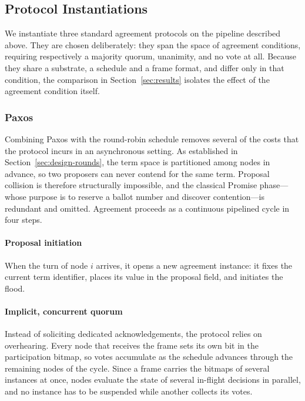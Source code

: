 \documentclass[journal]{IEEEtran}
\newcommand{\CI}{CI}                      %
\begin{document}
\subsection{Protocol Instantiations}
\label{sec:design-protocols}
We instantiate three standard agreement protocols on the pipeline
described above. They are chosen deliberately: they span the space of
agreement conditions, requiring respectively a majority quorum, unanimity,
and no vote at all. Because they share a substrate, a schedule and a frame
format, and differ only in that condition, the comparison in
Section~\ref{sec:results} isolates the effect of the agreement condition
itself.

\subsubsection{Paxos}
\label{sec:design-paxos}


Combining Paxos with the round-robin schedule removes several of the
costs that the protocol incurs in an asynchronous setting. As established
in Section~\ref{sec:design-rounds}, the term space is partitioned among
nodes in advance, so two proposers can never contend for the same term.
Proposal collision is therefore structurally impossible, and the classical
Promise phase---whose purpose is to reserve a ballot number and discover
contention---is redundant and omitted. Agreement proceeds as a continuous
pipelined cycle in four steps.

\paragraph{Proposal initiation}
When the turn of node $i$ arrives, it opens a new agreement instance: it
fixes the current term identifier, places its value in the proposal field,
and initiates the flood.

\paragraph{Implicit, concurrent quorum}
Instead of soliciting dedicated acknowledgements, the protocol relies on
overhearing. Every node that receives the frame sets its own bit in the
participation bitmap, so votes accumulate as the schedule advances through
the remaining nodes of the cycle. Since a frame carries the bitmaps of
several instances at once, nodes evaluate the state of several
in-flight decisions in parallel, and no instance has to be suspended while
another collects its votes.
\end{document}
